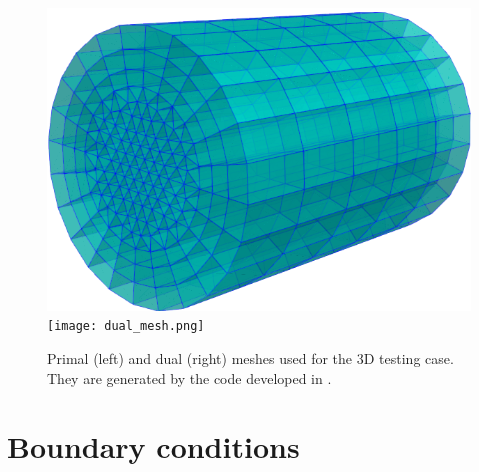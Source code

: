 \documentclass{report}
\begin{document}
\begin{figure}
    \centering
    \includegraphics[scale=0.4]{primal_mesh.png}
    \hspace{2cm}
    \texttt{[image: dual\_mesh.png]}
    \caption{Primal (left) and dual (right) meshes used for the 3D testing case. They are generated by the code developed in \cite{fuchs_2021}.}
    \label{fig:primal_dual_meshes}
\end{figure}

\section{Boundary conditions} \label{sec:numerical_experiement_bc}
\end{document}
